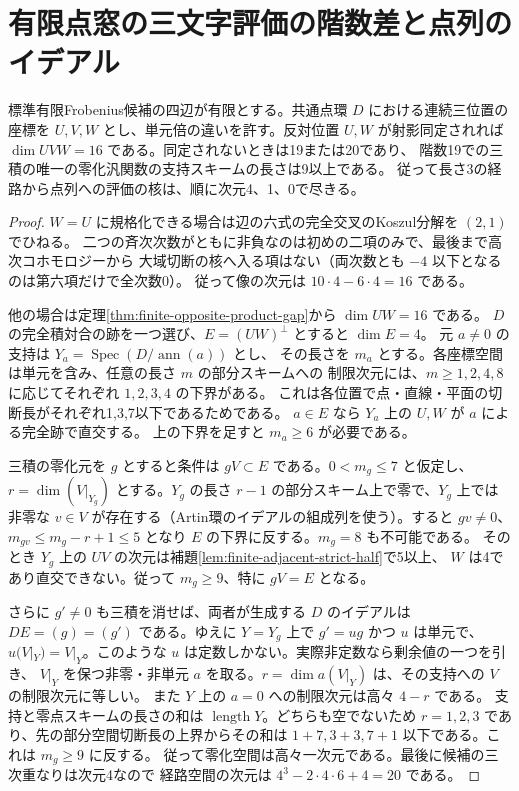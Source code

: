 \section{有限点窓の三文字評価の階数差と点列のイデアル}
\label{sec:finite-three-slot-evaluations}
\begin{theorem}\label{thm:finite-three-slot-evaluations}
標準有限Frobenius候補の四辺が有限とする。共通点環 $D$ における連続三位置の座標を
$U,V,W$ とし、単元倍の違いを許す。反対位置 $U,W$ が射影同定されれば
$\dim UVW=16$ である。同定されないときは19または20であり、
階数19での三積の唯一の零化汎関数の支持スキームの長さは9以上である。
従って長さ3の経路から点列への評価の核は、順に次元4、1、0で尽きる。
\end{theorem}
\begin{proof}
$W=U$ に規格化できる場合は辺の六式の完全交叉のKoszul分解を $(2,1)$ でひねる。
二つの斉次次数がともに非負なのは初めの二項のみで、最後まで高次コホモロジーから
大域切断の核へ入る項はない（両次数とも $-4$ 以下となるのは第六項だけで全次数0）。
従って像の次元は $10\cdot4-6\cdot4=16$ である。

他の場合は定理\ref{thm:finite-opposite-product-gap}から $\dim UW=16$ である。
$D$ の完全積対合の跡を一つ選び、$E=(UW)^\perp$ とすると $\dim E=4$。
元 $a\ne0$ の支持は $Y_a=\operatorname{Spec}(D/\operatorname{ann}(a))$ とし、
その長さを $m_a$ とする。各座標空間は単元を含み、任意の長さ $m$ の部分スキームへの
制限次元には、$m\ge1,2,4,8$ に応じてそれぞれ $1,2,3,4$ の下界がある。
これは各位置で点・直線・平面の切断長がそれぞれ1,3,7以下であるためである。
$a\in E$ なら $Y_a$ 上の $U,W$ が $a$ による完全跡で直交する。
上の下界を足すと $m_a\ge6$ が必要である。

三積の零化元を $g$ とすると条件は $gV\subset E$ である。$0<m_g\le7$ と仮定し、
$r=\dim(V|_{Y_g})$ とする。$Y_g$ の長さ $r-1$ の部分スキーム上で零で、$Y_g$ 上では非零な
$v\in V$ が存在する（Artin環のイデアルの組成列を使う）。すると $gv\ne0$、
$m_{gv}\le m_g-r+1\le5$ となり $E$ の下界に反する。$m_g=8$ も不可能である。
そのとき $Y_g$ 上の $UV$ の次元は補題\ref{lem:finite-adjacent-strict-half}で5以上、
$W$ は4であり直交できない。従って $m_g\ge9$、特に $gV=E$ となる。

さらに $g'\ne0$ も三積を消せば、両者が生成する $D$ のイデアルは
$DE=(g)=(g')$ である。ゆえに $Y=Y_g$ 上で $g'=ug$ かつ $u$ は単元で、
$u(V|_Y)=V|_Y$。このような $u$ は定数しかない。実際非定数なら剰余値の一つを引き、
$V|_Y$ を保つ非零・非単元 $a$ を取る。$r=\dim a(V|_Y)$ は、その支持への $V$ の制限次元に等しい。
また $Y$ 上の $a=0$ への制限次元は高々 $4-r$ である。
支持と零点スキームの長さの和は $\operatorname{length}Y$。どちらも空でないため
$r=1,2,3$ であり、先の部分空間切断長の上界からその和は
$1+7,3+3,7+1$ 以下である。これは $m_g\ge9$ に反する。
従って零化空間は高々一次元である。最後に候補の三次重なりは次元4なので
経路空間の次元は $4^3-2\cdot 4\cdot6+4=20$ である。
\end{proof}

